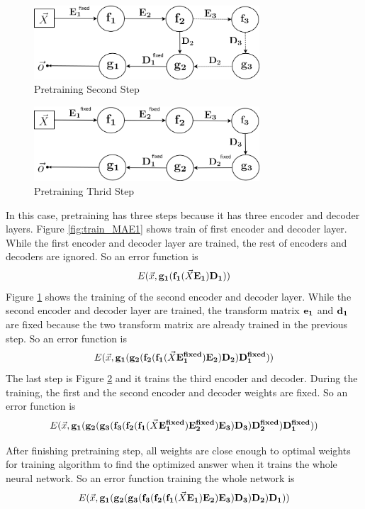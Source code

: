 \documentclass[draft,dvipsnames]{drexel-thesis}
\begin{document}
\begin{thesis}
\begin{figure}[t!]
    \centering
    \includegraphics[width=0.75\textwidth]{pictures/figures/train_MAE2.png}
    \caption{Pretraining Second Step}
    \label{fig:train_MAE2}
\end{figure}

\begin{figure}[t!]
    \centering
    \includegraphics[width=0.75\textwidth]{pictures/figures/train_MAE3.png}
    \caption{Pretraining Thrid Step}
    \label{fig:train_MAE3}
\end{figure}

	In this case, pretraining has three steps because it has three encoder and decoder layers. Figure \ref{fig:train_MAE1} shows train of first encoder and decoder layer. While the first encoder and decoder layer are trained, the rest of encoders and decoders are ignored. So an error function is
$$E(\vec{x}, \bold{g_1}(\bold{f_1}(\vec{X}\bold{E_1})\bold{D_1}))$$
Figure \ref{fig:train_MAE2} shows the training of the second encoder and decoder layer. While the second encoder and decoder layer are trained, the transform matrix $\bold{e_1}$ and $\bold{d_1}$ are fixed because the two transform matrix are already trained in the previous step. So an error function is
$$E(\vec{x}, \bold{g_1}(\bold{g_2}(\bold{f_2}(\bold{f_1}(\vec{X}\bold{E_1^{fixed}})\bold{E_2})\bold{D_2})\bold{D_1^{fixed}}))$$
The last step is Figure \ref{fig:train_MAE3} and it trains the third encoder and decoder. During the training, the first and the second encoder and decoder weights are fixed. So an error function is
$$E(\vec{x}, \bold{g_1}(\bold{g_2}(\bold{g_3}(\bold{f_3}(\bold{f_2}(\bold{f_1}(\vec{X}\bold{E_1^{fixed}})\bold{E_2^{fixed}})\bold{E_3})\bold{D_3})\bold{D_2^{fixed}})\bold{D_1^{fixed}}))$$

	After finishing pretraining step, all weights are close enough to optimal weights for training algorithm to find the optimized answer when it trains the whole neural network. So an error function training the whole network is
$$E(\vec{x}, \bold{g_1}(\bold{g_2}(\bold{g_3}(\bold{f_3}(\bold{f_2}(\bold{f_1}(\vec{X}\bold{E_1})\bold{E_2})\bold{E_3})\bold{D_3})\bold{D_2})\bold{D_1}))$$



\end{thesis}
\end{document}

